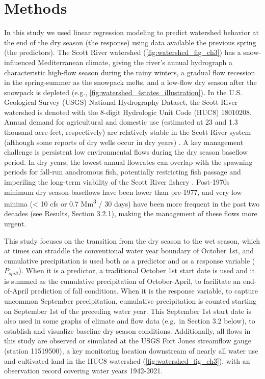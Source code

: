\documentclass[hess, manuscript]{copernicus}
\begin{document}
\section{Methods}

In this study we used linear regression modeling to predict watershed
behavior at the end of the dry season (the response) using data
available the previous spring (the predictors). The Scott River
watershed (\autoref{fig:watershed_fig_ch3}) has a snow-influenced
Mediterranean climate, giving the river's annual hydrograph a
characteristic high-flow season during the rainy winters, a gradual flow
recession in the spring-summer as the snowpack melts, and a low-flow dry
season after the snowpack is depleted (e.g.,
\autoref{fig:watershed_4states_illustration}). In the U.S. Geological
Survey (USGS) National Hydrography Dataset, the Scott River watershed is
denoted with the 8-digit Hydrologic Unit Code (HUC8) 18010208. Annual
demand for agricultural and domestic use (estimated at 23 and 1.3
thousand acre-feet, respectively) \citeyearpar[DWR][]{DWR2004} are
relatively stable in the Scott River system (although some reports of
dry wells occur in dry years) \citeyearpar[Siskiyou
County][]{SiskiyouCounty2021}. A key management challenge is persistent
low environmental flows during the dry season baseflow period. In dry
years, the lowest annual flowrates can overlap with the spawning periods
for fall-run anadromous fish, potentially restricting fish passage and
imperiling the long-term viability of the Scott River fishery
\citeyearpar[Siskiyou County][]{SiskiyouCounty2021}. Post-1970s minimum
dry season baseflows have been lower than pre-1977, and very low minima
(\textless{} 10 cfs or 0.7 Mm\textsuperscript{3} / 30 days) have been
more frequent in the past two decades (see Results, Section 3.2.1),
making the management of these flows more urgent.

This study focuses on the transition from the dry season to the wet
season, which at times can straddle the conventional water year boundary
of October 1st, and cumulative precipitation is used both as a predictor
and as a response variable (\(P_{spill}\)). When it is a predictor, a
traditional October 1st start date is used and it is summed as the
cumulative precipitation of October-April, to facilitate an end-of-April
prediction of fall conditions. When it is the response variable, to
capture uncommon September precipitation, cumulative precipitation is
counted starting on September 1st of the preceding water year. This
September 1st start date is also used in some graphs of climate and flow
data (e.g.~in Section 3.2 below), to establish and visualize baseline
dry season conditions. Additionally, all flows in this study are
observed or simulated at the USGS Fort Jones streamflow gauge (station
11519500), a key monitoring location downstream of nearly all water use
and cultivated land in the HUC8 watershed
(\autoref{fig:watershed_fig_ch3}), with an observation record covering
water years 1942-2021.
\end{document}
